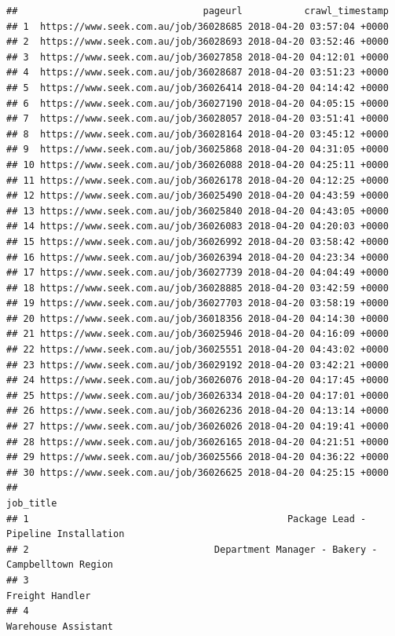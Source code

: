 \documentclass[11pt,a4paper,]{article}
\begin{document}
\begin{verbatim}
##                                 pageurl           crawl_timestamp
## 1  https://www.seek.com.au/job/36028685 2018-04-20 03:57:04 +0000
## 2  https://www.seek.com.au/job/36028693 2018-04-20 03:52:46 +0000
## 3  https://www.seek.com.au/job/36027858 2018-04-20 04:12:01 +0000
## 4  https://www.seek.com.au/job/36028687 2018-04-20 03:51:23 +0000
## 5  https://www.seek.com.au/job/36026414 2018-04-20 04:14:42 +0000
## 6  https://www.seek.com.au/job/36027190 2018-04-20 04:05:15 +0000
## 7  https://www.seek.com.au/job/36028057 2018-04-20 03:51:41 +0000
## 8  https://www.seek.com.au/job/36028164 2018-04-20 03:45:12 +0000
## 9  https://www.seek.com.au/job/36025868 2018-04-20 04:31:05 +0000
## 10 https://www.seek.com.au/job/36026088 2018-04-20 04:25:11 +0000
## 11 https://www.seek.com.au/job/36026178 2018-04-20 04:12:25 +0000
## 12 https://www.seek.com.au/job/36025490 2018-04-20 04:43:59 +0000
## 13 https://www.seek.com.au/job/36025840 2018-04-20 04:43:05 +0000
## 14 https://www.seek.com.au/job/36026083 2018-04-20 04:20:03 +0000
## 15 https://www.seek.com.au/job/36026992 2018-04-20 03:58:42 +0000
## 16 https://www.seek.com.au/job/36026394 2018-04-20 04:23:34 +0000
## 17 https://www.seek.com.au/job/36027739 2018-04-20 04:04:49 +0000
## 18 https://www.seek.com.au/job/36028885 2018-04-20 03:42:59 +0000
## 19 https://www.seek.com.au/job/36027703 2018-04-20 03:58:19 +0000
## 20 https://www.seek.com.au/job/36018356 2018-04-20 04:14:30 +0000
## 21 https://www.seek.com.au/job/36025946 2018-04-20 04:16:09 +0000
## 22 https://www.seek.com.au/job/36025551 2018-04-20 04:43:02 +0000
## 23 https://www.seek.com.au/job/36029192 2018-04-20 03:42:21 +0000
## 24 https://www.seek.com.au/job/36026076 2018-04-20 04:17:45 +0000
## 25 https://www.seek.com.au/job/36026334 2018-04-20 04:17:01 +0000
## 26 https://www.seek.com.au/job/36026236 2018-04-20 04:13:14 +0000
## 27 https://www.seek.com.au/job/36026026 2018-04-20 04:19:41 +0000
## 28 https://www.seek.com.au/job/36026165 2018-04-20 04:21:51 +0000
## 29 https://www.seek.com.au/job/36025566 2018-04-20 04:36:22 +0000
## 30 https://www.seek.com.au/job/36026625 2018-04-20 04:25:15 +0000
##                                                                           job_title
## 1                                              Package Lead - Pipeline Installation
## 2                                 Department Manager - Bakery - Campbelltown Region
## 3                                                                   Freight Handler
## 4                                                               Warehouse Assistant

\end{verbatim}
\end{document}
